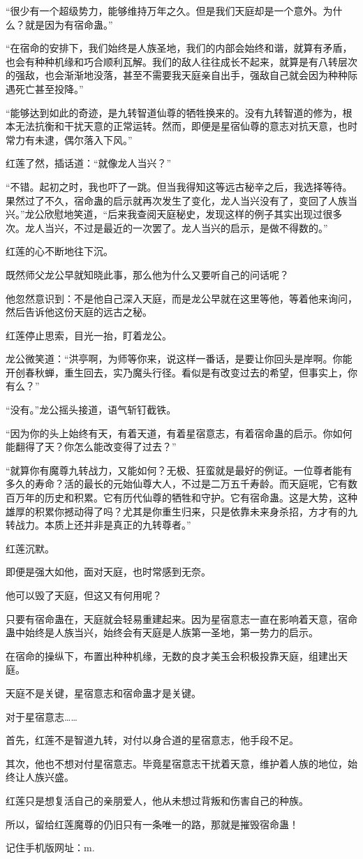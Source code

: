 \begin{this_body}
“很少有一个超级势力，能够维持万年之久。但是我们天庭却是一个意外。为什么？就是因为有宿命蛊。”

“在宿命的安排下，我们始终是人族圣地，我们的内部会始终和谐，就算有矛盾，也会有种种机缘和巧合顺利瓦解。我们的敌人往往成长不起来，就算是有八转层次的强敌，也会渐渐地没落，甚至不需要我天庭亲自出手，强敌自己就会因为种种际遇死亡甚至投降。”

“能够达到如此的奇迹，是九转智道仙尊的牺牲换来的。没有九转智道的修为，根本无法抗衡和干扰天意的正常运转。然而，即便是星宿仙尊的意志对抗天意，也时常力有未逮，偶尔落入下风。”

红莲了然，插话道：“就像龙人当兴？”

“不错。起初之时，我也吓了一跳。但当我得知这等远古秘辛之后，我选择等待。果然过了不久，宿命蛊的启示就再次发生了变化，龙人当兴没有了，变回了人族当兴。”龙公欣慰地笑道，“后来我查阅天庭秘史，发现这样的例子其实出现过很多次。龙人当兴，不过是最近的一次罢了。龙人当兴的启示，是做不得数的。”

红莲的心不断地往下沉。

既然师父龙公早就知晓此事，那么他为什么又要听自己的问话呢？

他忽然意识到：不是他自己深入天庭，而是龙公早就在这里等他，等着他来询问，然后告诉他这份天庭的远古之秘。

红莲停止思索，目光一抬，盯着龙公。

龙公微笑道：“洪亭啊，为师等你来，说这样一番话，是要让你回头是岸啊。你能开创春秋蝉，重生回去，实乃魔头行径。看似是有改变过去的希望，但事实上，你有么？”

“没有。”龙公摇头接道，语气斩钉截铁。

“因为你的头上始终有天，有着天道，有着星宿意志，有着宿命蛊的启示。你如何能翻得了天？你怎么能改变得了过去？”

“就算你有魔尊九转战力，又能如何？无极、狂蛮就是最好的例证。一位尊者能有多久的寿命？活的最长的元始仙尊大人，不过是二万五千寿龄。而天庭呢，它有数百万年的历史和积累。它有历代仙尊的牺牲和守护。它有宿命蛊。这是大势，这种雄厚的积累你撼动得了吗？尤其是你重生归来，只是依靠未来身杀招，方才有的九转战力。本质上还并非是真正的九转尊者。”

红莲沉默。

即便是强大如他，面对天庭，也时常感到无奈。

他可以毁了天庭，但这又有何用呢？

只要有宿命蛊在，天庭就会轻易重建起来。因为星宿意志一直在影响着天意，宿命蛊中始终是人族当兴，始终会有天庭是人族第一圣地，第一势力的启示。

在宿命的操纵下，布置出种种机缘，无数的良才美玉会积极投靠天庭，组建出天庭。

天庭不是关键，星宿意志和宿命蛊才是关键。

对于星宿意志……

首先，红莲不是智道九转，对付以身合道的星宿意志，他手段不足。

其次，他也不想对付星宿意志。毕竟星宿意志干扰着天意，维护着人族的地位，始终让人族兴盛。

红莲只是想复活自己的亲朋爱人，他从未想过背叛和伤害自己的种族。

所以，留给红莲魔尊的仍旧只有一条唯一的路，那就是摧毁宿命蛊！

记住手机版网址：m.

\end{this_body}

